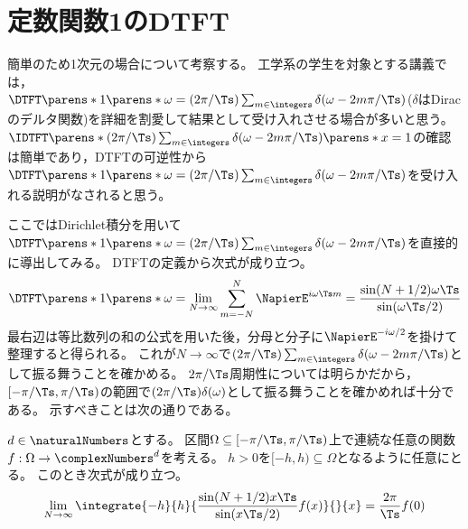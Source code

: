     \section{定数関数1のDTFT}
        \label{定数関数1のDTFT}
        簡単のため1次元の場合について考察する。
        工学系の学生を対象とする講義では，\\
        $\DTFT\parens*{1}\parens*{\omega} = (2\pi/\Ts)\sum_{m\in\integers}\delta(\omega-2m\pi/\Ts)$($\delta$はDiracのデルタ関数)を詳細を割愛して結果として受け入れさせる場合が多いと思う。
        $\IDTFT\parens*{(2\pi/\Ts)\sum_{m\in\integers}\delta(\omega-2m\pi/\Ts)}\parens*{x}=1$の確認は簡単であり，DTFTの可逆性から$\DTFT\parens*{1}\parens*{\omega} = (2\pi/\Ts)\sum_{m\in\integers}\delta(\omega-2m\pi/\Ts)$を受け入れる説明がなされると思う。
        \par
        ここではDirichlet積分を用いて$\DTFT\parens*{1}\parens*{\omega} = (2\pi/\Ts)\sum_{m\in\integers}\delta(\omega-2m\pi/\Ts)$を直接的に導出してみる。
        DTFTの定義から次式が成り立つ。
        \[
            \DTFT\parens*{1}\parens*{\omega} = \lim_{N\to\infty} \sum_{m=-N}^N \NapierE^{i\omega \Ts m} = \frac{\sin(N+1/2)\omega \Ts}{\sin(\omega \Ts/2)}
        \]
        最右辺は等比数列の和の公式を用いた後，分母と分子に$\NapierE^{-i\omega/2}$を掛けて整理すると得られる。
        これが$N\to\infty$で$(2\pi/\Ts)\sum_{m\in\integers}\delta(\omega-2m\pi/\Ts)$として振る舞うことを確かめる。
        $2\pi/\Ts$周期性については明らかだから，$[-\pi/\Ts,\pi/\Ts)$の範囲で$(2\pi/\Ts)\delta(\omega)$として振る舞うことを確かめれば十分である。
        示すべきことは次の通りである。
        \begin{shadebox}
            $d\in\naturalNumbers$とする。
            区間$\Omega \subseteq [-\pi/\Ts,\pi/\Ts)$上で連続な任意の関数$f:\Omega\to\complexNumbers^d$を考える。
            $h>0$を$[-h,h) \subseteq \Omega$となるように任意にとる。
            このとき次式が成り立つ。
            \[
                \lim_{N\to\infty} \integrate{-h}{h}{\frac{\sin(N+1/2)x \Ts}{\sin(x \Ts/2)} f(x)}{}{x} = \frac{2\pi}{\Ts} f(0)
            \]
        \end{shadebox}
